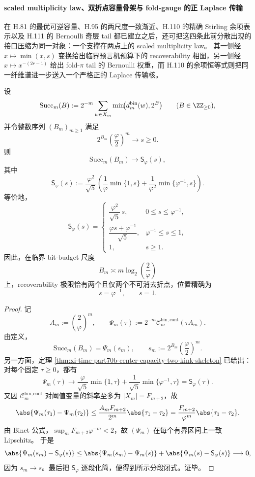 \paragraph{scaled multiplicity law、双折点容量骨架与 fold-gauge 的正 Laplace 传输}
在 H.81 的最优可逆容量、H.95 的两尺度一致渐近、H.110 的精确 Stirling 余项表示以及 H.111 的 Bernoulli 奇层 tail 都已建立之后，还可把这四条此前分散出现的接口压缩为同一对象：一个支撑在两点上的 scaled multiplicity law。
其一侧经 \(x\mapsto \min(x,s)\) 变换给出临界预言机预算下的 recoverability 相图，另一侧经 \(x\mapsto x^{-(2r-1)}\) 给出 fold-\(\pi\) tail 的 Bernoulli 权重，而 H.110 的余项恒等式则把同一纤维谱进一步送入一个严格正的 Laplace 传输核。

\begin{theorem}[临界预言机预算的双折点相变律]\label{thm:xi-time-part9zbd-scaled-multiplicity-double-kink}
设
\[
\mathrm{Succ}_m(B):=
2^{-m}\sum_{w\in X_m}\min\!\bigl(d_m^{\mathrm{bin}}(w),2^B\bigr)
\qquad (B\in\ZZ_{\ge 0}),
\]
并令整数序列 \((B_m)_{m\ge 1}\) 满足
\[
2^{B_m}\left(\frac{\varphi}{2}\right)^m\longrightarrow s\ge 0.
\]
则
\[
\mathrm{Succ}_m(B_m)\longrightarrow \mathsf S_\varphi(s),
\]
其中
\[
\mathsf S_\varphi(s):=
\frac{\varphi^2}{\sqrt5}
\left(
\frac1\varphi \min\{1,s\}
+
\frac1{\varphi^2}\min\{\varphi^{-1},s\}
\right).
\]
等价地，
\[
\mathsf S_\varphi(s)=
\begin{cases}
\dfrac{\varphi^2}{\sqrt5}\,s, & 0\le s\le \varphi^{-1},\\[6pt]
\dfrac{\varphi s+\varphi^{-1}}{\sqrt5}, & \varphi^{-1}\le s\le 1,\\[6pt]
1, & s\ge 1.
\end{cases}
\]
因此，在临界 bit-budget 尺度
\[
B_m\asymp m\log_2\!\left(\frac{2}{\varphi}\right)
\]
上，recoverability 极限恰有两个且仅两个不可消去折点，位置精确为
\[
s=\varphi^{-1},
\qquad
s=1.
\]
\end{theorem}
\begin{proof}
记
\[
A_m:=\left(\frac{2}{\varphi}\right)^m,
\qquad
\Psi_m(\tau):=
2^{-m}\mathcal C_m^{\mathrm{bin,cont}}(\tau A_m).
\]
由定义，
\[
\mathrm{Succ}_m(B_m)=\Psi_m(s_m),
\qquad
s_m:=2^{B_m}\left(\frac{\varphi}{2}\right)^m.
\]
另一方面，定理 \ref{thm:xi-time-part70b-center-capacity-two-kink-skeleton} 已给出：对每个固定 \(\tau\ge 0\)，都有
\[
\Psi_m(\tau)\longrightarrow
\frac{\varphi}{\sqrt5}\min\{1,\tau\}
+
\frac{1}{\sqrt5}\min\{\varphi^{-1},\tau\}
=
\mathsf S_\varphi(\tau).
\]
又因 \(\mathcal C_m^{\mathrm{bin,cont}}\) 对阈值变量的斜率至多为 \(|X_m|=F_{m+2}\)，故
\[
\abs{\Psi_m(\tau_1)-\Psi_m(\tau_2)}
\le
\frac{A_mF_{m+2}}{2^m}\abs{\tau_1-\tau_2}
=
\frac{F_{m+2}}{\varphi^m}\abs{\tau_1-\tau_2}.
\]
由 Binet 公式，\(\sup_m F_{m+2}\varphi^{-m}<2\)，故 \((\Psi_m)\) 在每个有界区间上一致 Lipschitz。
于是
\[
\abs{\Psi_m(s_m)-\mathsf S_\varphi(s)}
\le
\abs{\Psi_m(s_m)-\Psi_m(s)}
+
\abs{\Psi_m(s)-\mathsf S_\varphi(s)}
\longrightarrow 0,
\]
因为 \(s_m\to s\)。最后把 \(\mathsf S_\varphi\) 逐段化简，便得到所示分段闭式。证毕。
\end{proof}

